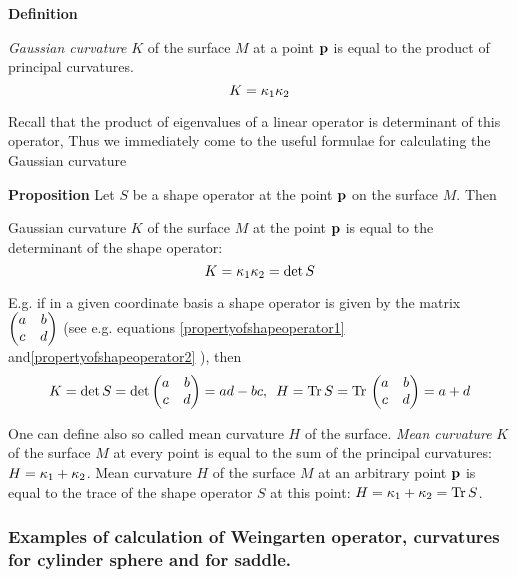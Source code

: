 \documentclass[12pt]{article}
\theoremstyle{theorem}
\numberwithin{equation}{section}
\begin{document}
{  \m

{\bf Definition}

      {\it Gaussian curvature} $K$ of the surface $M$ at a point ${\bf p}$ is equal to
                  the product of principal curvatures.
                  \begin{equation}\label{gaussinacurvaturedef0}
                    K={\kappa}_1{\kappa}_2
                    \end{equation}




  Recall that the product of eigenvalues of a linear operator is determinant of this operator,
  Thus we immediately come to the useful formulae for calculating the Gaussian 
curvature
                        

 {\bf Proposition}  Let $S$ be a shape operator at 
the point ${\bf p}$ on the surface $M$.  Then

Gaussian curvature $K$ of the  surface $M$ at the point ${\bf p}$ is equal to the determinant of the shape operator:
\begin{equation}\label{gauscurvasdeterm}
    K={\kappa}_1{\kappa}_2=\det S
\end{equation}



 E.g. if  in a given coordinate basis  a shape operator is given by the matrix
 $\begin{pmatrix}a &b\cr c &d\end{pmatrix}$ (see e.g. equations \eqref{propertyofshapeoperator1}
 and\eqref{propertyofshapeoperator2} ),
then
                  \begin{equation}\label{exampleofcalcugaussian}
    K=\det S=\det \begin{pmatrix}a &b\cr c &d\cr\end{pmatrix}=ad-bc,\,\,\,
    H={\rm Tr\,} S={\rm Tr\,}\begin{pmatrix}a &b\cr c &d\cr\end{pmatrix}=a+d
          \end{equation}

{\footnotesize   One can define also so called {mean curvature}  $H$
of the surface. {\it Mean curvature} $K$ of the surface $M$ 
at every point is equal to
                  the sum of the principal curvatures:
 $H={\kappa}_1+{\kappa}_2$.
Mean curvature  $H$ of the  surface $M$ at an arbitrary point ${\bf p}$ 
is equal to the trace of the shape operator
$S$ at this point: $H={\kappa}_1+{\kappa}_2={\rm Tr\,} S$.
}

\m


 \subsubsection {Examples of calculation of Weingarten operator,
curvatures for cylinder sphere and for saddle.}

}
\end{document}
